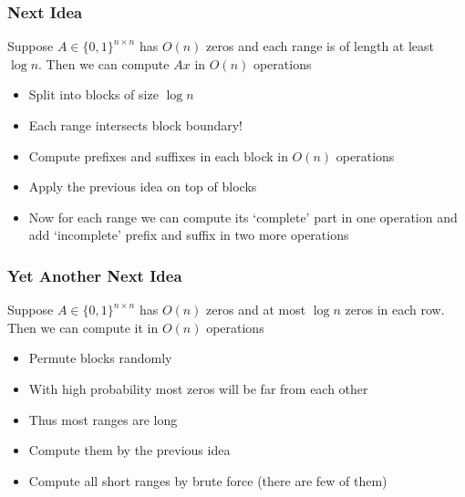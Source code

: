 \documentclass{beamer}
\begin{document}
\begin{frame}
\frametitle{Next Idea}

\begin{lemma}
Suppose $A \in \{0,1\}^{n\times n}$ has $O(n)$ zeros and each range is of length at least $\log n$. Then we can compute $Ax$ in $O(n)$ operations
\end{lemma}

\begin{itemize}
\item Split into blocks of size $\log n$
\item Each range intersects block boundary!
\item Compute prefixes and suffixes in each block in $O(n)$ operations
\item Apply the previous idea on top of blocks
\item Now for each range we can compute its `complete' part in one operation and add `incomplete' prefix and suffix in two more operations
\end{itemize}

\end{frame}

\begin{frame}
\frametitle{Yet Another Next Idea}

\begin{lemma}
Suppose $A \in \{0,1\}^{n\times n}$ has $O(n)$ zeros and at most $\log n$ zeros in each row. Then we can compute it in $O(n)$ operations
\end{lemma}

\begin{itemize}
\item Permute blocks randomly
\item With high probability most zeros will be far from each other
\item Thus most ranges are long
\item Compute them by the previous idea
\item Compute all short ranges by brute force (there are few of them)
\end{itemize}

\end{frame}
\end{document}

